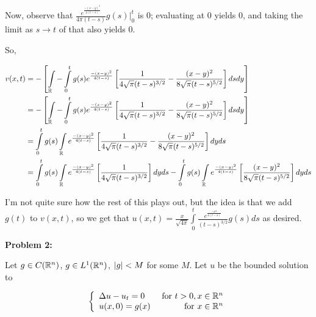 \documentclass[a4paper,12pt]{article}
\begin{document}
Now, observe that $\frac{e^{\frac{-(x-y)^2}{4(t-s)}}}{4\pi(t-s)} g(s) \Big|_0^t$ is $0$; evaluating at $0$ yields $0$, and taking the limit as $s \to t$ of that also yields $0$. %

So,

\begin{align*}
v(x,t) &= -\left[ \int\limits_{\mathbb{R}} - \int\limits_0^t g(s) e^{\frac{-(x-y)^2}{4(t-s)}} \left[ \frac{1}{4 \sqrt{\pi} (t-s)^{3/2}} -  \frac{(x-y)^2}{8 \sqrt{\pi} (t-s)^{5/2}}\right]  dsdy \right]\\
&= -\left[ \int\limits_{\mathbb{R}} - \int\limits_0^t g(s) e^{\frac{-(x-y)^2}{4(t-s)}} \left[ \frac{1}{4 \sqrt{\pi} (t-s)^{3/2}} -  \frac{(x-y)^2}{8 \sqrt{\pi} (t-s)^{5/2}}\right]  dsdy \right]\\
&=  \int\limits_0^t g(s)\int\limits_{\mathbb{R}} e^{\frac{-(x-y)^2}{4(t-s)}} \left[ \frac{1}{4 \sqrt{\pi} (t-s)^{3/2}} -  \frac{(x-y)^2}{8 \sqrt{\pi} (t-s)^{5/2}} \right] dyds\\
&=  \int\limits_0^t g(s)\int\limits_{\mathbb{R}} e^{\frac{-(x-y)^2}{4(t-s)}} \left[ \frac{1}{4 \sqrt{\pi} (t-s)^{3/2}}\right]dyds - \int\limits_0^t g(s)\int\limits_{\mathbb{R}} e^{\frac{-(x-y)^2}{4(t-s)}} \left[ \frac{(x-y)^2}{8 \sqrt{\pi} (t-s)^{5/2}} \right] dyds\\
\end{align*} %

I'm not quite sure how the rest of this plays out, but the idea is that we add $g(t)$ to $v(x,t)$, so we get that $u(x,t) = \frac{x}{\sqrt{4\pi}} \int\limits_0^t \frac{e^{\frac{-x^2}{4(t-s)}}}{(t-s)^{3/2}} g(s) ds$ as desired.


\shunt

{\bf Problem 2:}

Let $g \in C(\mathbb{R}^n)$, $g \in L^1(\mathbb{R}^n)$, $\left\lvert g \right\rvert < M$ for some $M$. Let $u$ be the bounded solution to 

\begin{displaymath}
   \left\{
     \begin{array}{lr}
       \Delta u -u_t  = 0 & \text{ for } t>0, x \in \mathbb{R}^n \\
       u(x,0) = g(x) & \text{ for } x \in \mathbb{R}^n
     \end{array}
   \right.
\end{displaymath}
\end{document}
